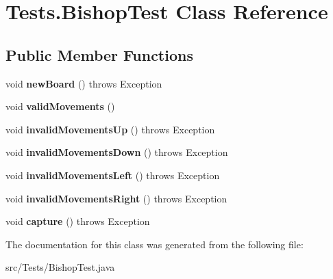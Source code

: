 \hypertarget{class_tests_1_1_bishop_test}{}\section{Tests.\+Bishop\+Test Class Reference}
\label{class_tests_1_1_bishop_test}
\subsection*{Public Member Functions}
\begin{DoxyCompactItemize}
\item 
\mbox{\label{class_tests_1_1_bishop_test_a1b9cb3227cb0ff2ea8e8b8201db465be}} 
void {\bfseries new\+Board} ()  throws Exception
\item 
\mbox{\label{class_tests_1_1_bishop_test_a33357092d0ec343da995c66f1f23b3d8}} 
void {\bfseries valid\+Movements} ()
\item 
\mbox{\label{class_tests_1_1_bishop_test_a03f2cbde855c13d3f26437c1fe3f601d}} 
void {\bfseries invalid\+Movements\+Up} ()  throws Exception 
\item 
\mbox{\label{class_tests_1_1_bishop_test_aa4b0ab1764449a0d025edd2a6e47152a}} 
void {\bfseries invalid\+Movements\+Down} ()  throws Exception 
\item 
\mbox{\label{class_tests_1_1_bishop_test_aac61ed86407ed72f409784fc304b99ef}} 
void {\bfseries invalid\+Movements\+Left} ()  throws Exception 
\item 
\mbox{\label{class_tests_1_1_bishop_test_a748c02b9b3fce08a5eb210ef627512ff}} 
void {\bfseries invalid\+Movements\+Right} ()  throws Exception 
\item 
\mbox{\label{class_tests_1_1_bishop_test_aa79118e5210690e8fbb29e490f355fe5}} 
void {\bfseries capture} ()  throws Exception 
\end{DoxyCompactItemize}


The documentation for this class was generated from the following file\+:\begin{DoxyCompactItemize}
\item 
src/\+Tests/Bishop\+Test.\+java\end{DoxyCompactItemize}
